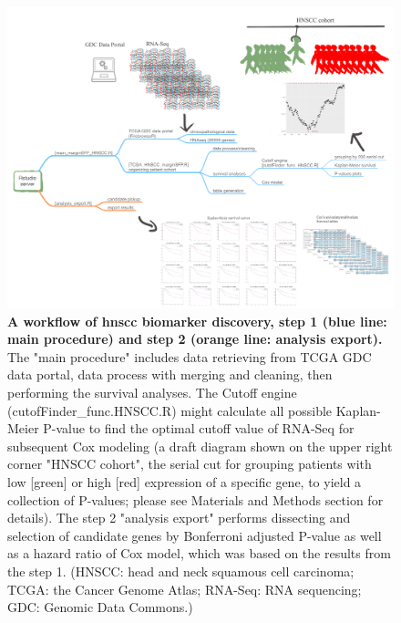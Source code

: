 \documentclass[cancers,article,submit,moreauthors,pdftex]{Definitions/mdpi}
\newcommand{\bcaption}[2]{\caption{\textbf{#1} #2}}
\begin{document}
\begin{figure}[hp]
\centering
\includegraphics[width=14cm]{Figure_1_manuscript_workflow} %
\bcaption{A workflow of \acrshort{hnscc} biomarker discovery, step 1 (blue line: main procedure) and step 2 (orange line: analysis export).}
{The "main procedure" includes data retrieving from TCGA GDC data portal, data process with merging and cleaning, then performing the survival analyses. The Cutoff engine (cutofFinder\_func.HNSCC.R) might calculate all possible Kaplan-Meier P-value to find the optimal cutoff value of RNA-Seq for subsequent Cox modeling (a draft diagram shown on the upper right corner "HNSCC cohort", the serial cut for grouping patients with low [green] or high [red] expression of a specific gene, to yield a collection of P-values; please see Materials and Methods section for details). The step 2 "analysis export" performs dissecting and selection of candidate genes by Bonferroni adjusted P-value as well as a hazard ratio of Cox model, which was based on the results from the step 1.
(HNSCC: head and neck squamous cell carcinoma; TCGA: the Cancer Genome Atlas; RNA-Seq: RNA sequencing; GDC: Genomic Data Commons.)}
\label{fig:figure1}
\end{figure}

\clearpage
\end{document}
